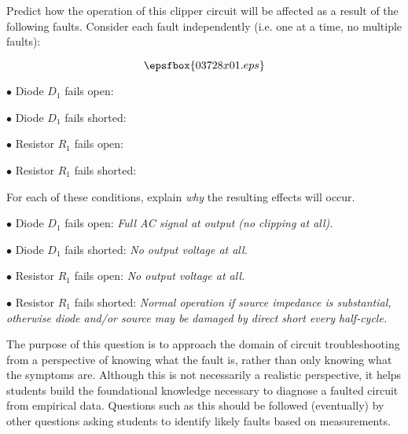 

Predict how the operation of this clipper circuit will be affected as a result of the following faults.  Consider each fault independently (i.e. one at a time, no multiple faults):

$$\epsfbox{03728x01.eps}$$

\medskip
\item{$\bullet$} Diode $D_1$ fails open:
\vskip 5pt
\item{$\bullet$} Diode $D_1$ fails shorted:
\vskip 5pt
\item{$\bullet$} Resistor $R_1$ fails open:
\vskip 5pt
\item{$\bullet$} Resistor $R_1$ fails shorted:
\medskip

For each of these conditions, explain {\it why} the resulting effects will occur.







\medskip
\item{$\bullet$} Diode $D_1$ fails open: {\it Full AC signal at output (no clipping at all).}
\vskip 5pt
\item{$\bullet$} Diode $D_1$ fails shorted: {\it No output voltage at all.}
\vskip 5pt
\item{$\bullet$} Resistor $R_1$ fails open: {\it No output voltage at all.}
\vskip 5pt
\item{$\bullet$} Resistor $R_1$ fails shorted: {\it Normal operation if source impedance is substantial, otherwise diode and/or source may be damaged by direct short every half-cycle.}
\medskip







The purpose of this question is to approach the domain of circuit troubleshooting from a perspective of knowing what the fault is, rather than only knowing what the symptoms are.  Although this is not necessarily a realistic perspective, it helps students build the foundational knowledge necessary to diagnose a faulted circuit from empirical data.  Questions such as this should be followed (eventually) by other questions asking students to identify likely faults based on measurements.




